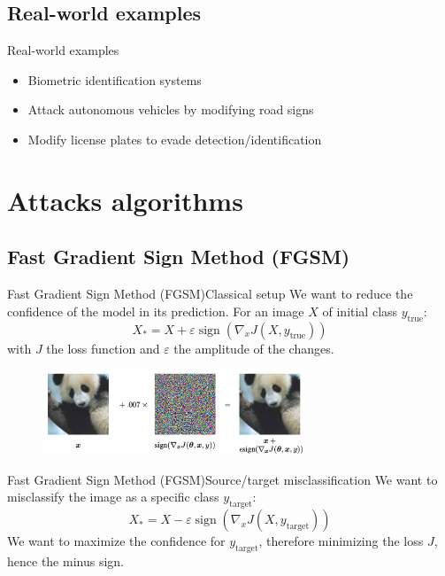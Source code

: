 \documentclass[aspectratio=169]{beamer}
\theoremstyle{definition}
\renewcommand{\epsilon}{\varepsilon}
\DeclareMathOperator*{\sign}{sign}
\begin{document}
\subsection{Real-world examples}
\begin{frame}{Real-world examples}
  \begin{itemize}
    \item Biometric identification systems
    \item Attack autonomous vehicles by modifying road signs
    \item Modify license plates to evade detection/identification
  \end{itemize}
\end{frame}

\section{Attacks algorithms}
\subsection{Fast Gradient Sign Method (FGSM)}
\begin{frame}{Fast Gradient Sign Method (FGSM)}{Classical setup}
  We want to reduce the confidence of the model in its prediction. For an image $X$ of initial class $y_{\text{true}}$:
  \begin{equation*}
    X_* = X + \epsilon\sign\left(\nabla_x J(X, y_{\text{true}})\right)
  \end{equation*}
  with $J$ the loss function and $\epsilon$ the amplitude of the changes.
  \begin{figure}
    \centering
    \includegraphics[width=0.7\textwidth]{panda-fgsm.png}
  \end{figure}
\end{frame}

\begin{frame}{Fast Gradient Sign Method (FGSM)}{Source/target misclassification}
  We want to misclassify the image as a specific class $y_{\text{target}}$:
  \begin{equation*}
    X_* = X - \epsilon\sign\left(\nabla_x J(X, y_{\text{target}})\right)
  \end{equation*}
  We want to maximize the confidence for $y_{\text{target}}$, therefore minimizing the loss $J$, hence the minus sign.
\end{frame}
\end{document}
